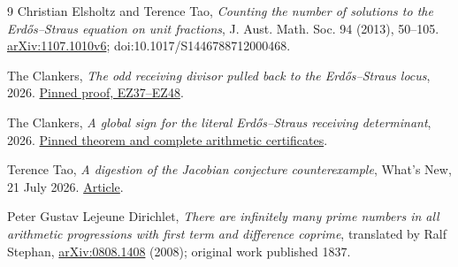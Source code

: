 \documentclass[11pt,reqno]{amsart}
\begin{document}
\begin{thebibliography}{9}
Christian Elsholtz and Terence Tao,
\emph{Counting the number of solutions to the Erd\H{o}s--Straus equation on
unit fractions}, J. Aust. Math. Soc. 94 (2013), 50--105.
\href{https://arxiv.org/abs/1107.1010}{arXiv:1107.1010v6};
doi:10.1017/S1446788712000468.

The Clankers,
\emph{The odd receiving divisor pulled back to the Erd\H{o}s--Straus locus},
2026.
\href{https://github.com/KokunoYumeto/erdos-straus-foundation/blob/799c53ffbad2dd9826ed8cb59ac9fe04958a3ce1/research/incoming/es-fable-zeta-bridge-20260920/ODD_RECEIVER_ES_PULLBACK.tex\#L19-L215}{Pinned proof, EZ37--EZ48}.

The Clankers,
\emph{A global sign for the literal Erd\H{o}s--Straus receiving determinant},
2026.
\href{https://github.com/KokunoYumeto/erdos-straus-foundation/blob/799c53ffbad2dd9826ed8cb59ac9fe04958a3ce1/research/incoming/es-turn07-global-receiver-determinant-20260921/core.tex\#L1-L488}{Pinned theorem and complete arithmetic certificates}.

Terence Tao,
\emph{A digestion of the Jacobian conjecture counterexample},
What's New, 21 July 2026.
\href{https://terrytao.wordpress.com/2026/07/21/a-digestion-of-the-jacobian-conjecture-counterexample/}{Article}.

Peter Gustav Lejeune Dirichlet,
\emph{There are infinitely many prime numbers in all arithmetic progressions
with first term and difference coprime}, translated by Ralf Stephan,
\href{https://arxiv.org/abs/0808.1408}{arXiv:0808.1408} (2008);
original work published 1837.
\end{thebibliography}
\end{document}
